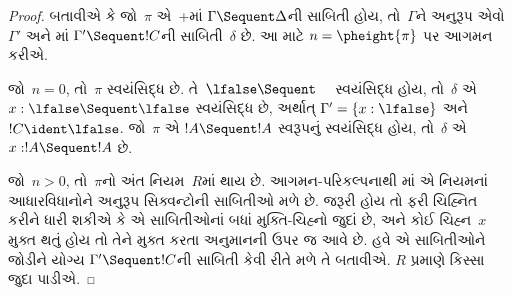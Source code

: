 \begin{proof}
  બતાવીએ કે જો~$\pi$
  એ~+\Cut{}માં
  $\Gamma \Sequent \Delta$ની
  સાબિતી હોય,
  તો~$\Gamma$ને અનુરૂપ
  એવો~$\Gamma'$ અને
  માં
  $\Gamma' \Sequent !C$ની
  સાબિતી~$\delta$
  છે.
  આ માટે
  $n = \pheight{\pi}$
  પર આગમન કરીએ.

  જો~$n = 0$, તો~$\pi$
  સ્વયંસિદ્ધ છે.
  તે~$\lfalse \Sequent
  \quad$ સ્વયંસિદ્ધ હોય,
  તો~$\delta$ એ
  $x:\lfalse \Sequent \lfalse$
  સ્વયંસિદ્ધ છે,
  અર્થાત્
  $\Gamma' = \{x:\lfalse\}$
  અને~$!C \ident \lfalse$.
  જો~$\pi$ એ
  $!A \Sequent !A$
  સ્વરૂપનું સ્વયંસિદ્ધ
  હોય, તો~$\delta$
  એ~$x: !A \Sequent !A$ છે.
  
  જો~$n>0$, તો~$\pi$નો
  અંત નિયમ~$R$માં થાય છે.
  આગમન-પરિકલ્પનાથી
  માં એ
  નિયમનાં આધારવિધાનોને
  અનુરૂપ સિક્વન્ટોની
  સાબિતીઓ મળે છે.
  જરૂરી હોય તો ફરી
  ચિહ્નિત કરીને ધારી
  શકીએ કે એ સાબિતીઓનાં
  બધાં મુક્તિ-ચિહ્નો
  જુદાં છે, અને
  કોઈ ચિહ્ન~$x$
  મુક્ત થતું હોય
  તો તેને મુક્ત કરતા
  અનુમાનની ઉપર જ
  આવે છે.
  હવે એ સાબિતીઓને
  જોડીને યોગ્ય
  $\Gamma' \Sequent !C$ની
  સાબિતી કેવી રીતે
  મળે તે બતાવીએ.
  $R$ પ્રમાણે કિસ્સા
  જુદા પાડીએ.


\end{proof}
